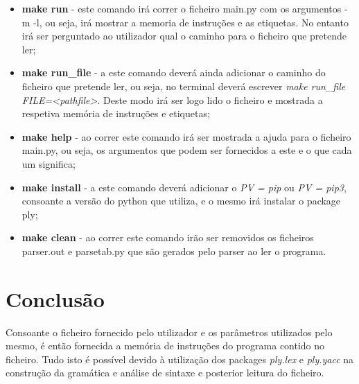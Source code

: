 \documentclass[titlepage,11pt,svgnames]{article}   %
\begin{document}
\begin{itemize}
\item \textbf{make run} - este comando irá correr o ficheiro main.py com os argumentos -m -l, ou seja, irá mostrar a memoria de instruções e as etiquetas. No entanto irá ser perguntado ao utilizador qual o caminho para o ficheiro que pretende ler;
\item \textbf{make run\_file} - a este comando deverá ainda adicionar o caminho do ficheiro que pretende ler, ou seja, no terminal deverá escrever \textit{make run\_file FILE=<pathfile>}. Deste modo irá ser logo lido o ficheiro e mostrada a respetiva memória de instruções e etiquetas;
\item \textbf{make help} - ao correr este comando irá ser mostrada a ajuda para o ficheiro main.py, ou seja, os argumentos que podem ser fornecidos a este e o que cada um significa;
\item \textbf{make install} - a este comando deverá adicionar o \textit{PV = pip} ou \textit{PV = pip3}, consoante a versão do python que utiliza, e o mesmo irá instalar o package ply;
\item \textbf{make clean} - ao correr este comando irão ser removidos os ficheiros parser.out  e parsetab.py que são gerados pelo parser ao ler o programa.
\end{itemize}

\pagebreak
\section{Conclusão}

Consoante o ficheiro fornecido pelo utilizador e os parâmetros utilizados pelo mesmo, é então fornecida a memória de instruções do programa contido no ficheiro. Tudo isto é possível devido à utilização dos packages \textit{ply.lex} e \textit{ply.yacc} na construção da gramática e análise de sintaxe e posterior leitura do ficheiro.
\end{document}
